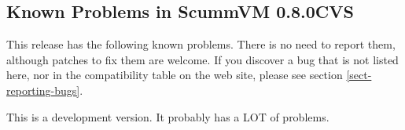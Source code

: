 

\subsection{Known Problems in ScummVM 0.8.0CVS}

This release has the following known problems. There is no need to report them,
although patches to fix them are welcome. If you discover a bug that is not
listed here, nor in the compatibility table on the web site, please see
section \ref{sect-reporting-bugs}.

This is a development version. It probably has a LOT of problems. 
